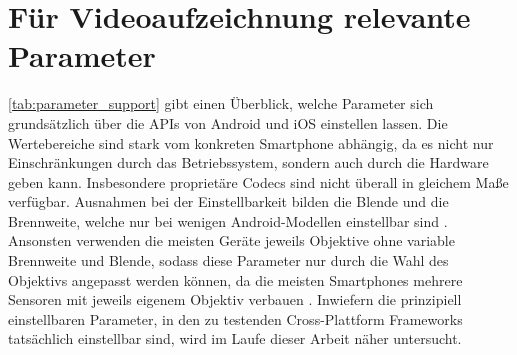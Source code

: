 \section{Für Videoaufzeichnung relevante Parameter}
\label{sec:relevante_parameter}

\autoref{tab:parameter_support} gibt einen Überblick, welche Parameter sich grundsätzlich über die \acp{API} von Android und iOS einstellen lassen.
Die Wertebereiche sind stark vom konkreten Smartphone abhängig, da es nicht nur Einschränkungen durch das Betriebssystem, sondern auch durch die Hardware geben kann.
Insbesondere proprietäre Codecs sind nicht überall in gleichem Maße verfügbar.
Ausnahmen bei der Einstellbarkeit bilden die Blende und die Brennweite, welche nur bei wenigen Android-Modellen einstellbar sind \cite{Sony_VariableZoom,VariableAperture_Smartphones}.
Ansonsten verwenden die meisten Geräte jeweils Objektive ohne variable Brennweite und Blende, sodass diese Parameter nur durch die Wahl des Objektivs angepasst werden können, da die meisten Smartphones mehrere Sensoren mit jeweils eigenem Objektiv verbauen \cite[S. 499ff.]{Schmidt_Videotechnik}.
Inwiefern die prinzipiell einstellbaren Parameter, in den zu testenden Cross-Plattform Frameworks tatsächlich einstellbar sind, wird im Laufe dieser Arbeit näher untersucht.

